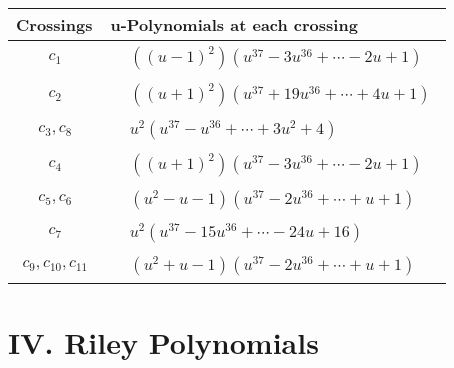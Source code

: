 \documentclass[1p]{elsarticle_modified}
\theoremstyle{definition}
\begin{document}
\begin{tabular}{m{50pt}|m{274pt}}
Crossings & \hspace{64pt}u-Polynomials at each crossing \\
\hline $$\begin{aligned}c_{1}\end{aligned}$$&$\begin{aligned}
&((u-1)^2)(u^{37}-3 u^{36}+\cdots-2 u+1)
\end{aligned}$\\
\hline $$\begin{aligned}c_{2}\end{aligned}$$&$\begin{aligned}
&((u+1)^2)(u^{37}+19 u^{36}+\cdots+4 u+1)
\end{aligned}$\\
\hline $$\begin{aligned}c_{3},c_{8}\end{aligned}$$&$\begin{aligned}
&u^2(u^{37}- u^{36}+\cdots+3 u^2+4)
\end{aligned}$\\
\hline $$\begin{aligned}c_{4}\end{aligned}$$&$\begin{aligned}
&((u+1)^2)(u^{37}-3 u^{36}+\cdots-2 u+1)
\end{aligned}$\\
\hline $$\begin{aligned}c_{5},c_{6}\end{aligned}$$&$\begin{aligned}
&(u^2- u-1)(u^{37}-2 u^{36}+\cdots+u+1)
\end{aligned}$\\
\hline $$\begin{aligned}c_{7}\end{aligned}$$&$\begin{aligned}
&u^2(u^{37}-15 u^{36}+\cdots-24 u+16)
\end{aligned}$\\
\hline $$\begin{aligned}c_{9},c_{10},c_{11}\end{aligned}$$&$\begin{aligned}
&(u^2+u-1)(u^{37}-2 u^{36}+\cdots+u+1)
\end{aligned}$\\
\hline
\end{tabular}\newpage\renewcommand{\arraystretch}{1}
\centering \section*{ IV. Riley Polynomials}
\end{document}
